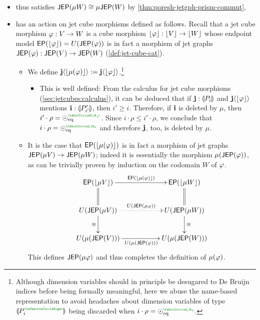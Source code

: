 \documentclass[a4paper]{memoir}
\begin{document}
\begin{definition}
\begin{itemize}
\begin{itemize}
\[\begin{array}{c | l || c | c || c}
				\end{array}
			\]
			\item thus satisfies $\mathsf{JEP}(\mu W) \cong \mu \mathsf{JEP}(W)$ by \cref{thm:poresh-jetgph-prism-commut},
			\item has an action on jet cube morphisms defined as follows. Recall that a jet cube morphism $\varphi : V \to W$ is a cube morphism $\mathopen{}\left\lfloor \varphi \right\rfloor\mathclose{} : \mathopen{}\left\lfloor V \right\rfloor\mathclose{} \to \mathopen{}\left\lfloor W \right\rfloor\mathclose{}$ whose endpoint model $\mathsf{EP}(\mathopen{}\left\lfloor \varphi \right\rfloor\mathclose{}) = U(\mathsf{JEP}(\varphi))$ is in fact a morphism of jet graphs $\mathsf{JEP}(\varphi) : \mathsf{JEP}(V) \to \mathsf{JEP}(W)$ (\cref{def:jet-cube-cat}).
			\begin{itemize}
				\item We define $\mathbf{j} \langle \mathopen{}\left\lfloor \mu(\varphi) \right\rfloor\mathclose{} \rangle := \mathbf{j} \langle \mathopen{}\left\lfloor \varphi \right\rfloor\mathclose{} \rangle$.\footnote{Although dimension variables should in principle be desugared to De Bruijn indices before being formally meaningful, here we abuse the name-based representation to avoid headaches about dimension variables of type $\rival{P_i\pmry}$ being discarded when $i \cdot \rho = \nonpol_\eqtydeg\pmrhom{\npolar}{a_i}$.}
				\begin{itemize}
					\item This is well defined:
					From the calculus for jet cube morphisms (\cref{sec:jetcubes:calculus}), it can be deduced that if $\mathbf{j} : {\llparenthesis P_i \rrparenthesis}$ and $\mathbf{j} \langle \mathopen{}\left\lfloor \varphi \right\rfloor\mathclose{} \rangle$ mentions $\mathbf{i} : {\llparenthesis P'_{i'} \rrparenthesis}$, then $i' \geq i$.
					Therefore, if $\mathbf{i}$ is deleted by $\mu$, then $i' \cdot \rho = \nonpol_\eqtydeg\pmrhom{\npolar}{a_{i'}}$.
					Since $i \cdot \rho \leq i' \cdot \rho$, we conclude that $i \cdot \rho = \nonpol_\eqtydeg\pmrhom{\npolar}{a_{i}}$ and therefore $\mathbf{j}$, too, is deleted by $\mu$.
				\end{itemize}
				\item It is the case that $\mathsf{EP}(\mathopen{}\left\lfloor \mu(\varphi) \right\rfloor\mathclose{})$ is in fact a morphism of jet graphs $\mathsf{JEP}(\mu V) \to \mathsf{JEP}(\mu W)$;
				indeed it is essentially the morphism $\mu(\mathsf{JEP}(\varphi))$, as can be trivially proven by induction on the codomain $W$ of $\varphi$.
				\[
					\xymatrix{
						\EP(\erasejc{\mu V})
							\ar[rr]^{\EP(\erasejc{\mu(\vfi)})}
							\ar@{=}[d]
						&& \EP(\erasejc{\mu W})
							\ar@{=}[d]
						\\
						U(\JEP(\mu V))
							\ar@{.>}[rr]^{U(\JEP(\mu \vfi))}
							\ar[d]_{\cong}
						&& U(\JEP(\mu W))
							\ar[d]^{\cong}
						\\
						U(\mu(\JEP(V)))
							\ar[rr]_{U(\mu(\JEP(\vfi)))}
						&& U(\mu(\JEP(W)))
					}
				\]
				This defines $\mathsf{JEP}(\mu \varphi)$ and thus completes the definition of $\mu(\varphi)$.

\end{itemize}
\end{itemize}
\end{itemize}
\end{definition}
\end{document}
